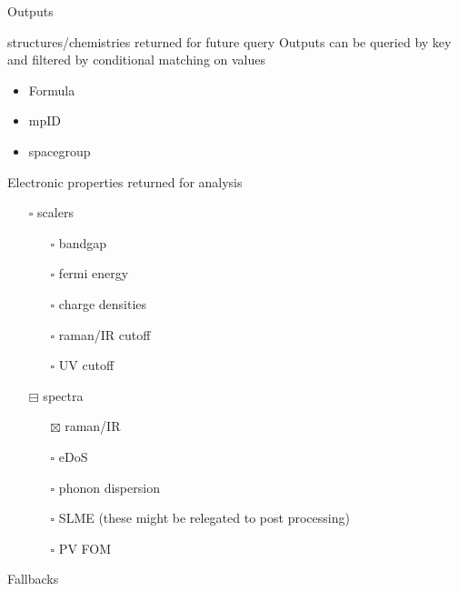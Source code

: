 \documentclass[8pt, compress]{beamer}
\begin{document}
\begin{frame}[allowframebreaks]{Outputs}
\begin{block}{structures/chemistries returned for future query}
Outputs can be queried by key and filtered by conditional matching on values
\begin{itemize}
\item Formula
\item mpID
\item spacegroup
\end{itemize}
\end{block}
\begin{block}{Electronic properties returned for analysis}
\begin{itemize}
\item[{$\square$}] scalers
\begin{itemize}
\item[{$\square$}] bandgap
\item[{$\square$}] fermi energy
\item[{$\square$}] charge densities
\item[{$\square$}] raman/IR cutoff
\item[{$\square$}] UV cutoff
\end{itemize}
\item[{$\boxminus$}] spectra
\begin{itemize}
\item[{$\boxtimes$}] raman/IR
\item[{$\square$}] eDoS
\item[{$\square$}] phonon dispersion
\item[{$\square$}] SLME (these might be relegated to post processing)
\item[{$\square$}] PV FOM
\end{itemize}
\end{itemize}
\end{block}
\begin{block}{Fallbacks}
\end{block}
\end{frame}
\end{document}
